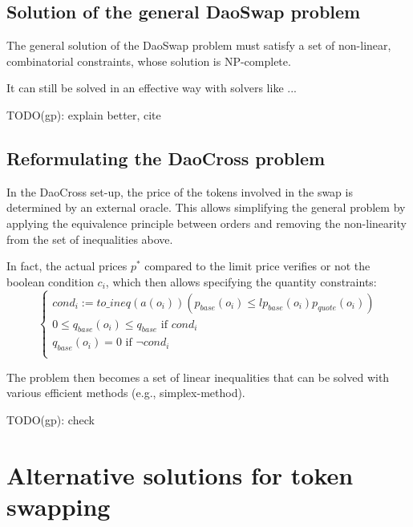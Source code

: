 \documentclass[11pt, reqno]{amsart}
\begin{document}
\subsection{Solution of the general DaoSwap problem}

The general solution of the DaoSwap problem must satisfy a set of non-linear,
combinatorial constraints, whose solution is NP-complete.

It can still be solved in an effective way with solvers like ...

TODO(gp): explain better, cite

\subsection{Reformulating the DaoCross problem}
In the DaoCross set-up, the price of the tokens involved in the swap is
determined by an external oracle.
This allows simplifying the general problem by applying the equivalence
principle between orders and removing the non-linearity from the set of
inequalities above.

In fact, the actual prices $p^*$ compared to the limit price verifies or not the
boolean condition $c_i$, which then allows specifying the quantity
constraints:
\begin{equation}
  \begin{cases}
    cond_i := \mathit{to\_ineq}(a(o_i))(p_{base}(o_i) \leq lp_{base}(o_i) p_{quote}(o_i)) \\
    0 \le q_{base}(o_i) \le q_{base} \text{ if } cond_i \\
    q_{base}(o_i) = 0 \text{ if } \lnot cond_i \\
  \end{cases}
\end{equation}

The problem then becomes a set of linear inequalities that can be solved with
various efficient methods (e.g., simplex-method).

TODO(gp): check




\section{Alternative solutions for token swapping}
\end{document}
